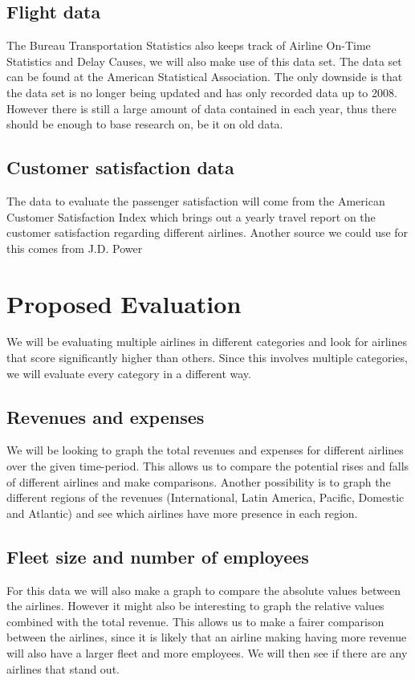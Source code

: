 \documentclass[11pt,oneside]{book}
\begin{document}
\section*{Flight data}
The Bureau Transportation Statistics also keeps track of Airline On-Time Statistics and Delay Causes, we will also make use of this data set. The data set can be found at the American Statistical Association\cite{asa}. The only downside is that the data set is no longer being updated and has only recorded data up to 2008. However there is still a large amount of data contained in each year, thus there should be enough to base research on, be it on old data. 
\section*{Customer satisfaction data} 
\indent The data to evaluate the passenger satisfaction will come from the American Customer Satisfaction Index\cite{acsi} which brings out a yearly travel report on the customer satisfaction regarding different airlines. Another source we could use for this comes from J.D. Power\cite{jdpower}

\chapter{Proposed Evaluation} 
We will be evaluating multiple airlines in different categories and look for airlines that score significantly higher than others. Since this involves multiple categories, we will evaluate every category in a different way.
\section*{Revenues and expenses}
We will be looking to graph the total revenues and expenses for different airlines over the given time-period. This allows us to compare the potential rises and falls of different airlines and make comparisons. Another possibility is to graph the different regions of the revenues (International, Latin America, Pacific, Domestic and Atlantic) and see which airlines have more presence in each region. 
\section*{Fleet size and number of employees}
For this data we will also make a graph to compare the absolute values between the airlines. However it might also be interesting to graph the relative values combined with the total revenue. This allows us to make a fairer comparison between the airlines, since it is likely that an airline making having more revenue will also have a larger fleet and more employees. We will then see if there are any airlines that stand out. 
\end{document}
